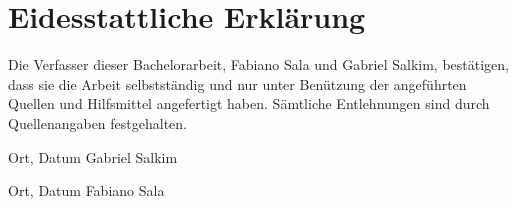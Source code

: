 \thispagestyle{plain}

\section*{Eidesstattliche Erklärung}
Die Verfasser dieser Bachelorarbeit, Fabiano Sala und Gabriel Salkim, bestätigen, dass sie die Arbeit selbstständig und nur unter Benützung der angeführten Quellen und Hilfsmittel angefertigt haben. Sämtliche Entlehnungen sind durch Quellenangaben festgehalten.
	
	
\vspace{2cm}

\hspace{2cm} Ort, Datum \hfill Gabriel Salkim \hspace{2cm}

\vspace{4cm}

\hspace{2cm} Ort, Datum \hfill Fabiano Sala \hspace{2cm}




